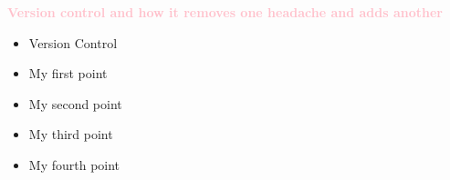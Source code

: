 \documentclass[landscape]{beamer}
\begin{document}
    \begin{frame}
        \thispagestyle{empty}
            \begin{center}
                \huge{\textbf{\textcolor{pink}{Version control and how it removes one headache and adds another}}}
            \end{center}
    \end{frame}

    \begin{frame}
        \thispagestyle{empty}
        
            \begin{huge}
                \begin{itemize}
                    \item Version Control
                    \item My first point
                    \item My second point
                    \item My third point
                    \item My fourth point
                \end{itemize}
            \end{huge}
        
    \end{frame}

    \begin{frame}
        \thispagestyle{empty}
    
    \end{frame}

    \begin{frame}
        \thispagestyle{empty}
    
    \end{frame}

    \begin{frame}
        \thispagestyle{empty}
    
    \end{frame}

    \begin{frame}
        
        
        \thispagestyle{empty}
    
    \end{frame}
\end{document}
